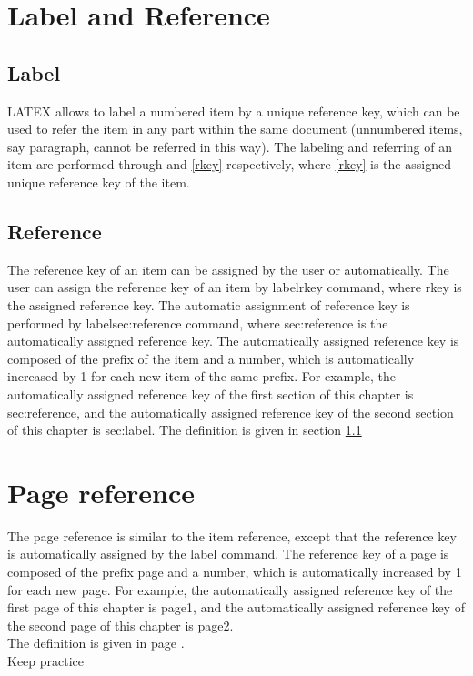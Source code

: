 \documentclass{book}
\begin{document}
\tableofcontents
\chapter{Label and Reference} \label{chap:chapter1}
\section{Label} \label{sec:label}
LATEX allows to label a numbered item by a unique reference key, which can be
used to refer the item in any part within the same document (unnumbered items, say
paragraph, cannot be referred in this way). The labeling and referring of an item
are performed through \label{rkey} and \ref{rkey} respectively, where \ref{rkey} is the
assigned unique reference key of the item.
\section{Reference} \label{sec:reference}
The reference key of an item can be assigned by the user or automatically. The user can assign the reference key of an item by label{rkey} command, where rkey is the assigned reference key. The automatic assignment of reference key is performed by label{sec:reference} command, where sec:reference is the automatically assigned reference key. The automatically assigned reference key is composed of the prefix of the item and a number, which is automatically increased by 1 for each new item of the same prefix. For example, the automatically assigned reference key of the first section of this chapter is sec:reference, and the automatically assigned reference key of the second section of this chapter is sec:label.
The definition is given in section \ref{sec:label}

\chapter{Page reference}
The page reference is similar to the item reference, except that the reference key is automatically assigned by the label{ } command.
The reference key of a page is composed of the prefix page and a number, which is automatically increased by 1 for each new page.
For example, the automatically assigned reference key of the first page of this chapter is page1, and the automatically assigned reference key of the second page of this chapter is page2. \\
The definition is given in page \pageref{sec:reference}.\\
Keep practice 
\end{document}
